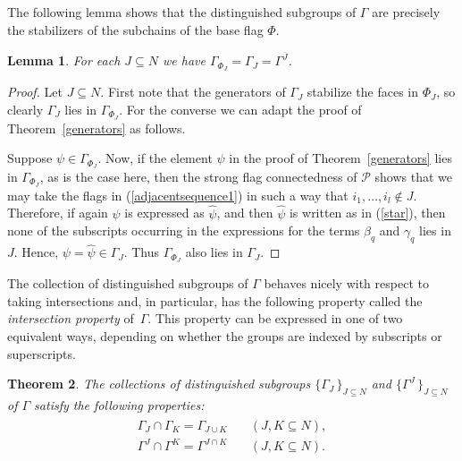 \documentclass[12pt]{article}
\renewcommand{\bar}{\overline}
\renewcommand{\>}{\rangle}
\newtheorem{theorem}{Theorem}[section]
\newtheorem{lemma}[theorem]{Lemma}
\theoremstyle{definition}\newtheorem{definition}{Definition}[section]
\begin{document}
The following lemma shows that the distinguished subgroups of $\Gamma$ are precisely the stabilizers of the subchains of the base flag $\Phi$.

\begin{lemma}
\label{gamstab}
For each $J\subseteq N$ we have $\Gamma_{\Phi_J}=\Gamma_J=\Gamma^{\bar{J}}$.
\end{lemma}

\begin{proof}
Let $J\subseteq N$. First note that the generators of $\Gamma_J$ stabilize the faces in $\Phi_J$, so clearly $\Gamma_J$ lies in $\Gamma_{\Phi_J}$. For the converse we can adapt the proof of Theorem~\ref{generators} as follows. 

Suppose $\psi\in\Gamma_{\Phi_J}$. Now, if the element $\psi$ in the proof of Theorem~\ref{generators} lies in $\Gamma_{\Phi_J}$, as is the case here, then the strong flag connectedness of $\mathcal{P}$ shows that we may take the flags in (\ref{adjacentsequence1}) in such a way that $i_1, \dots, i_l \notin J$. Therefore, if again $\psi$ is expressed as $\widehat{\psi}$, and then $\widehat{\psi}$ is written as in (\ref{star}), then none of the subscripts occurring in the expressions for the terms $\beta_q$ and $\gamma_q$ lies in $J$. Hence, $\psi=\widehat{\psi} \in \Gamma_J$. Thus $\Gamma_{\Phi_J}$ also lies in $\Gamma_J$.
\end{proof}

The collection of distinguished subgroups of $\Gamma$ behaves nicely with respect to taking intersections and, in particular, has the following property called the {\it intersection property} of~$\Gamma$. This property can be expressed in one of two equivalent ways, depending on whether the groups are indexed by subscripts or superscripts.

\begin{theorem}
\label{intcondlemma}
The collections of distinguished subgroups $\big\{\Gamma_{J}\!\,\big\}_{\!J\subseteq N}$ and $\big\{\Gamma^{J}\!\,\big\}_{\!J\subseteq N}$ of $\Gamma$ satisfy the following properties:
\begin{eqnarray}
\label{intcond}
\begin{array}{ll}
\Gamma_{J} \cap \Gamma_{K} = \Gamma_{J\cup K} &\quad (J,K \subseteq N),\\[.1in]
\Gamma^{J} \cap \Gamma^{K} = \Gamma^{J\cap K} &\quad (J,K \subseteq N).
\end{array}
\end{eqnarray}
\end{theorem}
\end{document}
